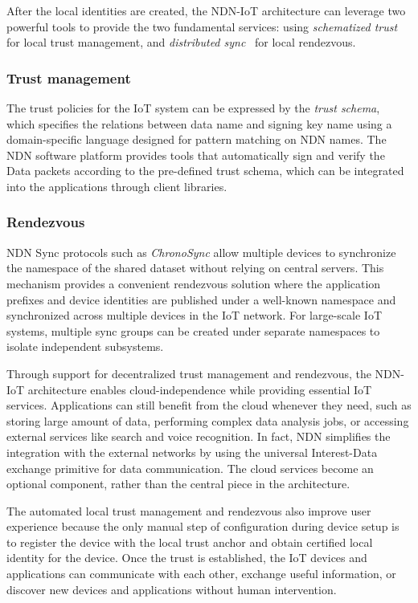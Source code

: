 After the local identities are created, the NDN-IoT architecture can leverage two powerful tools to provide the two fundamental services: using \emph{schematized trust}~\cite{trust-schema} for local trust management, and \emph{distributed sync}~\cite{chronosync} for local rendezvous.

\subsubsection{Trust management}
The trust policies for the IoT system can be expressed by the \emph{trust schema}, which specifies the relations between data name and signing key name using a domain-specific language designed for pattern matching on NDN names.
The NDN software platform provides tools that automatically sign and verify the Data packets according to the pre-defined trust schema, which can be integrated into the applications through client libraries.

\subsubsection{Rendezvous}
NDN Sync protocols such as \emph{ChronoSync} allow multiple devices to synchronize the namespace of the shared dataset without relying on central servers.
This mechanism provides a convenient rendezvous solution where the application prefixes and device identities are published under a well-known namespace and synchronized across multiple devices in the IoT network.
For large-scale IoT systems, multiple sync groups can be created under separate namespaces to isolate independent subsystems.

Through support for decentralized trust management and rendezvous, the NDN-IoT architecture enables cloud-independence while providing essential IoT services.
Applications can still benefit from the cloud whenever they need, such as storing large amount of data, performing complex data analysis jobs, or accessing external services like search and voice recognition.
In fact, NDN simplifies the integration with the external networks by using the universal Interest-Data exchange primitive for data communication.
The cloud services become an optional component, rather than the central piece in the architecture.

The automated local trust management and rendezvous also improve user experience because the only manual step of configuration during device setup is to register the device with the local trust anchor and obtain certified local identity for the device.
Once the trust is established, the IoT devices and applications can communicate with each other, exchange useful information, or discover new devices and applications without human intervention.